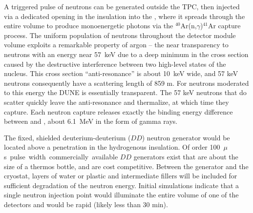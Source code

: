 A triggered pulse of neutrons can be generated outside the TPC, then injected via a dedicated opening in the insulation into the , where it spreads through the entire volume to produce monoenergetic photons via the $^{40}$Ar(n,$\gamma$)$^{41}$Ar capture process. The uniform population of neutrons throughout the detector module volume exploits a remarkable property of argon -- the near transparency to neutrons with an energy near \SI{57}{\keV} due to a deep minimum in the cross section caused by the destructive interference between two high-level states of the  nucleus. This cross section ``anti-resonance'' is about \SI{10}{\keV} wide, and 57 keV neutrons consequently have a scattering length of 859 m. For neutrons moderated to this energy the DUNE  is essentially transparent.
The 57 keV neutrons that do scatter quickly leave the anti-resonance and thermalize, at which time they capture. Each neutron capture releases exactly the binding energy difference between  and , about \SI{6.1}{\MeV} in the form of gamma rays.  



The fixed, shielded deuterium-deuterium ($DD$) neutron generator would be located above a penetration in the hydrogenous insulation. Of order \SI{100}{$\mu$s} pulse width commercially available $DD$ generators exist that are about the size of a thermos bottle, and are cost competitive. Between the generator and the cryostat, layers of water or plastic and intermediate fillers will be included for sufficient degradation of the neutron energy. Initial simulations indicate that a single neutron injection point would illuminate the entire volume of one of the  detectors and would be rapid (likely less than 30 min). 

